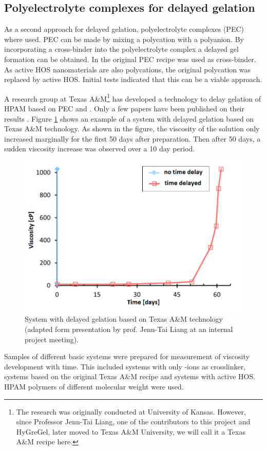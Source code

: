 \documentclass[nanomaterials,article,submit,moreauthors,pdftex]{Definitions/mdpi}
\begin{document}
\subsection{Polyelectrolyte complexes for delayed gelation}
As a second approach for delayed gelation, polyelectrolyte complexes (PEC) where used. PEC can be made by mixing a polycation with a polyanion. By incorporating a cross-binder into the polyelectrolyte complex a delayed gel formation can be obtained. In the original PEC recipe  was used as cross-binder. As active HOS nanomaterials are also polycations, the original polycation was replaced by active HOS. Initial tests indicated that this can be a viable approach.

A research group at Texas A\&M\footnote{The research was originally conducted at University of Kansas. However, since Professor Jenn-Tai Liang, one of the contributors to this project and HyGreGel, later moved to Texas A\&M University, we will call it a Texas A\&M recipe here.} has developed a technology to delay gelation of HPAM based on PEC and . Only a few papers have been published on their results \citep{Cordova2008,Johnson2010}. Figure \ref{cht:jennTai} shows an example of a system with delayed gelation based on Texas A\&M technology. As shown in the figure, the viscosity of the solution only increased marginally for the first 50 days after preparation. Then after 50 days, a sudden viscosity increase was observed over a 10 day period.

\begin{figure}[h!]
    \centering
    \includegraphics[width=.5\textwidth]{fig/jennTai.png}
    \caption{System with delayed gelation based on Texas A\&M technology \citep{Cordova2008} (adapted form presentation by prof. Jenn-Tai Liang at an internal project meeting).}
    \label{cht:jennTai}
\end{figure}
    
Samples of different basic systems were prepared for measurement of viscosity development with time. This included systems with only -ions as crosslinker, systems based on the original Texas A\&M recipe \citep{Cordova2008} and systems with active HOS. HPAM polymers of different molecular weight were used.
    
\end{document}
